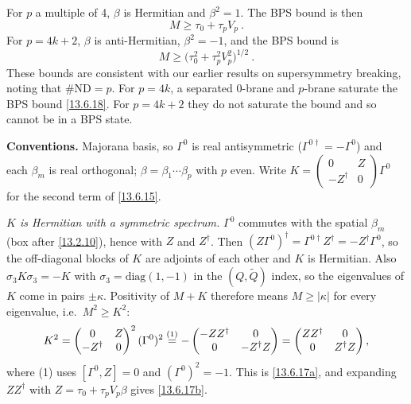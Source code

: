 For $p$ a multiple of 4, $\beta$ is Hermitian and $\beta^2 = 1$. The BPS bound is then
\begin{equation}
	M \ge \tau_0 + \tau_p V_p \:. \label{13.6.18}
\end{equation}
For $p = 4k + 2$, $\beta$ is anti-Hermitian, $\beta^2 = -1$, and the BPS bound is
\begin{equation}
	M \ge \bigl(\tau_0^2 + \tau_p^2 V_p^2\bigr)^{1/2} \:. \label{13.6.19}
\end{equation}
These bounds are consistent with our earlier results on supersymmetry breaking, noting that $\#\mathrm{ND} = p$. For $p = 4k$, a separated 0-brane and $p$-brane saturate the BPS bound \eqref{13.6.18}. For $p = 4k + 2$ they do not saturate the bound and so cannot be in a BPS state.
\begin{tcolorbox}[breakable]
	\begin{remark}
		\textbf{Conventions.} Majorana basis, so $\Gamma^0$ is real antisymmetric ($\Gamma^{0\dagger}=-\Gamma^0$) and each $\beta_m$ is real orthogonal; $\beta=\beta_1\cdots\beta_p$ with $p$ even. Write $K=\begin{pmatrix}0&Z\\-Z^\dagger&0\end{pmatrix}\Gamma^0$ for the second term of \eqref{13.6.15}.

		\textit{$K$ is Hermitian with a symmetric spectrum.} $\Gamma^0$ commutes with the spatial $\beta_m$ (box after \eqref{13.2.10}), hence with $Z$ and $Z^\dagger$. Then $(Z\Gamma^0)^\dagger=\Gamma^{0\dagger}Z^\dagger=-Z^\dagger\Gamma^0$, so the off-diagonal blocks of $K$ are adjoints of each other and $K$ is Hermitian. Also $\sigma_3K\sigma_3=-K$ with $\sigma_3=\mathrm{diag}(1,-1)$ in the $(Q,\tilde Q)$ index, so the eigenvalues of $K$ come in pairs $\pm\kappa$. Positivity of $M+K$ therefore means $M\ge|\kappa|$ for every eigenvalue, i.e.\ $M^2\ge K^2$:
		\begin{align*}
			K^2 = \begin{pmatrix}0&Z\\-Z^\dagger&0\end{pmatrix}^2(\Gamma^0)^2 \overset{(1)}{=} -\begin{pmatrix}-ZZ^\dagger&0\\0&-Z^\dagger Z\end{pmatrix} = \begin{pmatrix}ZZ^\dagger&0\\0&Z^\dagger Z\end{pmatrix},
		\end{align*}
		where (1) uses $[\Gamma^0,Z]=0$ and $(\Gamma^0)^2=-1$. This is \eqref{13.6.17a}, and expanding $ZZ^\dagger$ with $Z=\tau_0+\tau_pV_p\beta$ gives \eqref{13.6.17b}.


\end{remark}
\end{tcolorbox}
